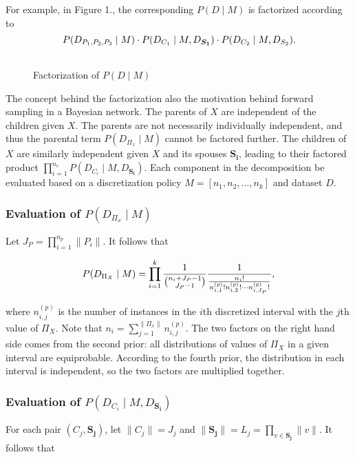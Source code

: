 For example, in Figure 1., the corresponding $P(D \mid M)$ is factorized according to
\begin{equation}
P\paren{D_{ P_1,P_2,P_3 } \mid M} \cdot P\paren{ D_{ C_1 } \mid M,D_{\boldsymbol{S_1}}} \cdot P\paren{D_{C_2} \mid M,D_{ S_2  }}\text{.}
\end{equation}

\begin{figure}[ht]
    \begin{tabular}{cc}
      
    \end{tabular}
  \caption{Factorization of $P(D \mid M)$}
\end{figure}


The concept behind the factorization also the motivation behind forward sampling in a Bayesian network.
The parents of $X$ are independent of the children given $X$.
The parents are not necessarily individually independent, and thus the parental term $P(D_{\Pi_x} \mid M)$ cannot be factored further.
The children of $X$ are similarly independent given $X$ and its spouses $\boldsymbol{S_i}$, leading to their factored product $\prod_{i = 1}^{n_c} P(D_{C_i} \mid M, D_{\boldsymbol{S_i}})$.
Each component in the decomposition be evaluated based on a discretization policy $M = [n_1,n_2,\ldots,n_k]$ and dataset $D$.

\subsubsection{Evaluation of $P(D_{\Pi_x} \mid M)$}
Let $J_P = \prod_{i=1}^{n_p} \| P_i \|$. It follows that

\begin{equation}
\label{eq:likelihood_one}
P(D_{\Pi_X} \mid M) = \prod_{i=1}^k  {{1}\over{{n_i + J_P - 1}\choose{J_P -1}}}
{{1}\over{ {{{n}_i}!}\over{ {n^{(p)}_{i,1} !} {n^{(p)}_{i,2} !} \cdots {n^{(p)}_{i,J_P} !}}  }}\text{,}
\end{equation}

\noindent
where $n^{(p)}_{i,j}$ is the number of instances in the $i$th discretized interval with the $j$th value of $\Pi_X$.
Note that $n_i = \sum_{j=1}^{\| \Pi_x \|} n^{(p)}_{i,j}$.
The two factors on the right hand side comes from the second prior: all distributions of values of $\Pi_X$ in a given interval are equiprobable. According to the fourth prior, the distribution in each interval is independent, so the two factors are multiplied together.

\subsubsection{Evaluation of $P(D_{C_i} \mid M, D_{\boldsymbol{S_i}})$}
For each pair $(C_j, \boldsymbol{S_j})$, let $\|C_j \| = J_j$ and $\| \boldsymbol{S_j} \| = L_j = \prod_{v \in \boldsymbol{S_j}} \| v \|$. It follows that

